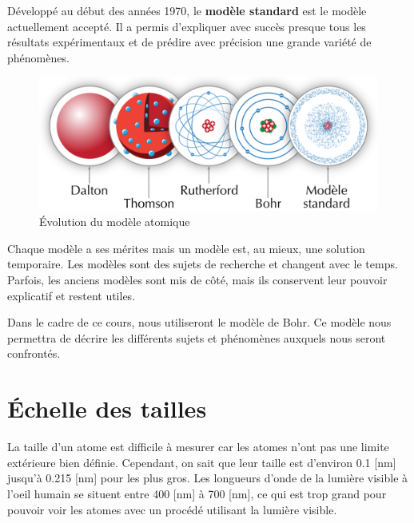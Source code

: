 \documentclass[
  11pt,
  french,
  a4paper,
  openany]{book}
\begin{document}
Développé au début des années 1970, le \textbf{modèle standard} est le modèle actuellement accepté. Il a permis d'expliquer avec succès presque tous les résultats expérimentaux et de prédire avec précision une grande variété de phénomènes.

\begin{figure}

{\centering \includegraphics[width=0.85\linewidth]{images/modeles-atomiques-evol-3} 

}

\caption{Évolution du modèle atomique}\label{fig:modeles-atomiques-evol-3}
\end{figure}

Chaque modèle a ses mérites mais un modèle est, au mieux, une solution temporaire. Les modèles sont des sujets de recherche et changent avec le temps. Parfois, les anciens modèles sont mis de côté, mais ils conservent leur pouvoir explicatif et restent utiles.

Dans le cadre de ce cours, nous utiliseront le modèle de Bohr. Ce modèle nous permettra de décrire les différents sujets et phénomènes auxquels nous seront confrontés.

\newpage

\hypertarget{uxe9chelle-des-tailles}{%
\section{Échelle des tailles}\label{uxe9chelle-des-tailles}}

La taille d'un atome est difficile à mesurer car les atomes n'ont pas une limite extérieure bien définie. Cependant, on sait que leur taille est d'environ 0.1 {[}nm{]} jusqu'à 0.215 {[}nm{]} pour les plus gros. Les longueurs d'onde de la lumière visible à l'oeil humain se situent entre 400 {[}nm{]} à 700 {[}nm{]}, ce qui est trop grand pour pouvoir voir les atomes avec un procédé utilisant la lumière visible.
\end{document}
